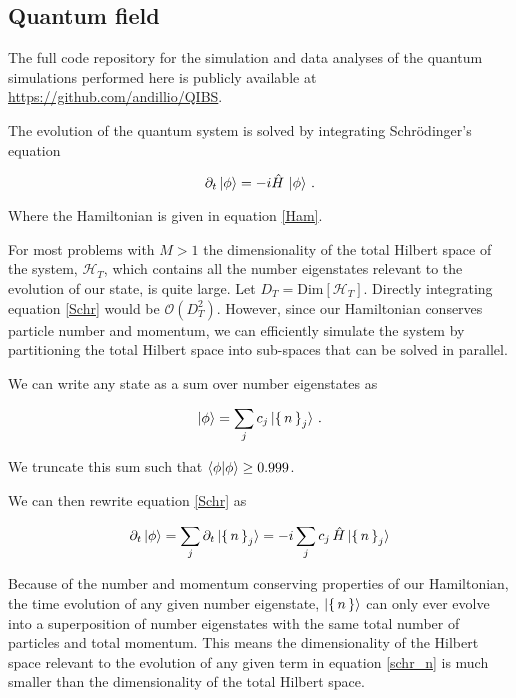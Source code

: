 \documentclass[aps,prd,twocolumn,superscriptaddress]{revtex4-1}
\begin{document}
\subsection{Quantum field}


The full code repository for the simulation and data analyses of the quantum simulations performed here is publicly available at \href{https://github.com/andillio/QIBS}{https://github.com/andillio/QIBS}.

The evolution of the quantum system is solved by integrating Schr\"odinger's equation 

\begin{equation} \label{Schr}
    \partial_t \ket{\phi} = -i \hat H \, \ket{\phi} \, .
\end{equation}

Where the Hamiltonian is given in equation \eqref{Ham}. 

For most problems with $M > 1$ the dimensionality of the total Hilbert space of the system, $\mathcal{H}_T$, which contains all the number eigenstates relevant to the evolution of our state, is quite large. Let $D_T = \mathrm{Dim}[\mathcal{H}_T]$. Directly integrating equation \eqref{Schr} would be $\mathcal{O}(D_T^2)$. However, since our Hamiltonian conserves particle number and momentum, we can efficiently simulate the system by partitioning the total Hilbert space into sub-spaces that can be solved in parallel.

We can write any state as a sum over number eigenstates as

\begin{equation} \label{sum_of_nums}
    \ket{\phi} = \sum_{ j } c_j \ket{\set{n}_j} \, .
\end{equation}

We truncate this sum such that $\braket{\phi | \phi} \ge 0.999$.

We can then rewrite equation \eqref{Schr} as

\begin{equation} \label{schr_n}
    \partial_t \ket{\phi} = \sum_j \partial_t \ket{\set{n}_j}  = -i \sum_{ j } c_j \, \hat H \ket{\set{n}_j} 
\end{equation}

Because of the number and momentum conserving properties of our Hamiltonian, the time evolution of any given number eigenstate, $\ket{\set{n}}$ can only ever evolve into a superposition of number eigenstates with the same total number of particles and total momentum. This means the dimensionality of the Hilbert space relevant to the evolution of any given term in equation \eqref{schr_n} is much smaller than the dimensionality of the total Hilbert space. 
\end{document}
